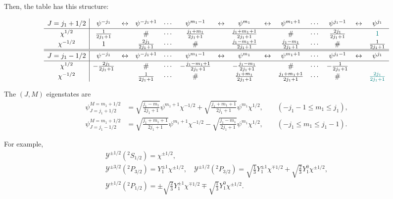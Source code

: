 \documentclass[amsmath,amssymb,prc,aps]{revtex4-2}
\newcommand{\Cyan}[1]{{\color[rgb]{0.0,0.5,0.5}\relax#1}}
\begin{document}
Then, the table has this structure:

\begin{align}
  \renewcommand{\arraystretch}{1.2}
  \begin{array}{c|ccccccccccccc}
  J=j_1+1/2     & \psi^{-j_1} & \leftrightarrow & \psi^{-j_1+1} & \cdots & \psi^{m_1-1} & \leftrightarrow & \psi^{m_1} & \leftrightarrow & \psi^{m_1+1} & \cdots & \psi^{j_1-1} & \leftrightarrow & \psi^{j_1} \\ \hline
  \chi^{1/2}    & \frac{1}{2j_1+1} && \#   &\cdots& \frac{j_1+m_1}{2j_1+1} && \frac{j_1+m_1+1}{2j_1+1} && \# &\cdots& \frac{2j_1}{2j_1+1} && \Cyan{1} \\
  \chi^{-1/2}   & 1 && \frac{2j_1}{2j_1+1} &\cdots& \# && \frac{j_1-m_1+1}{2j_1+1} && \frac{j_1-m_1}{2j_1+1} &\cdots& \# && \frac{1}{2j_1+1}
  \\\hline\hline
  J=j_1-1/2     & \psi^{-j_1} & \leftrightarrow & \psi^{-j_1+1} & \cdots & \psi^{m_1-1} & \leftrightarrow & \psi^{m_1} & \leftrightarrow & \psi^{m_1+1} & \cdots & \psi^{j_1-1} & \leftrightarrow & \psi^{j_1} \\ \hline
  \chi^{1/2}    & -\frac{2j_1}{2j_1+1} && \# &\cdots& -\frac{j_1-m_1+1}{2j_1+1} && -\frac{j_1-m_1}{2j_1+1} && \# &\cdots& -\frac{1}{2j_1+1} &&  \\
  \chi^{-1/2}   &    && \frac{1}{2j_1+1}     &\cdots& \# && \frac{j_1+m_1}{2j_1+1} && \frac{j_1+m_1+1}{2j_1+1}   &\cdots& \# && \Cyan{\frac{2j_1}{2j_1+1}}
  \end{array}
\end{align}

The $(J,M)$ eigenstates are
\begin{subequations}
\begin{align}
  \psi_{J=j_1+1/2}^{M=m_1+1/2} &= \sqrt{\frac{j_1-m_1}{2j_1+1}} \psi^{m_1+1}\chi^{-1/2}
    + \sqrt{\frac{j_1+m_1+1}{2j_1+1}} \psi^{m_1} \chi^{1/2}, \qquad (-j_1-1 \le m_1 \le j_1), \\
  \psi_{J=j_1-1/2}^{M=m_1+1/2} &= \sqrt{\frac{j_1+m_1+1}{2j_1+1}} \psi^{m_1+1}\chi^{-1/2}
    - \sqrt{\frac{j_1 - m_1}{2j_1+1}} \psi^{m_1} \chi^{1/2}, \qquad (-j_1 \le m_1 \le j_1-1).
\end{align}
\end{subequations}

For example,
\begin{subequations}
\begin{gather}
  \mathcal{Y}^{\pm 1/2}(^2S_{1/2}) = \chi^{\pm1/2}, \\
  \mathcal{Y}^{\pm 3/2}(^2P_{3/2}) = Y_1^{\pm1} \chi^{\pm1/2}, \quad
  \mathcal{Y}^{\pm 1/2}(^2P_{3/2}) = \sqrt{\frac13} Y_1^{\pm1} \chi^{\mp1/2} + \sqrt{\frac23} Y_1^0 \chi^{\pm1/2}, \\
  \mathcal{Y}^{\pm 1/2}(^2P_{1/2}) = \pm\sqrt{\frac23} Y_1^{\pm1} \chi^{\mp1/2} \mp \sqrt{\frac13} Y_1^0 \chi^{\pm1/2}.
\end{gather}
\end{subequations}
\end{document}
